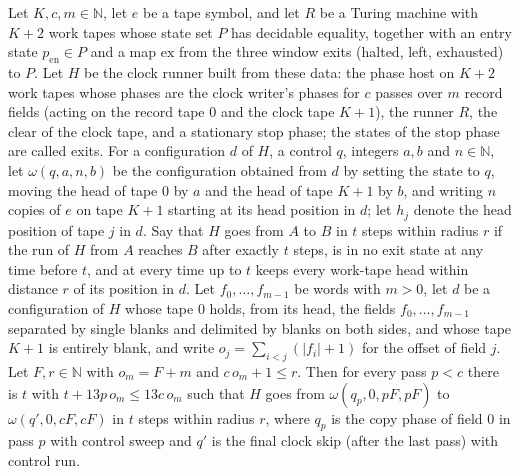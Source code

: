 \begin{lemma}
\label{Turing.cw_passes}
\leanok
{}
Let $K,c,m\in\mathbb{N}$, let $e$ be a tape symbol, and let $R$ be a Turing machine with $K+2$
work tapes whose state set $P$ has decidable equality, together with an entry state
$p_{\mathrm{en}}\in P$ and a map $\mathrm{ex}$ from the three window exits (halted, left,
exhausted) to $P$. Let $H$ be the clock runner built from these data: the phase host on $K+2$
work tapes whose phases are the clock writer's phases for $c$ passes over $m$ record fields
(acting on the record tape $0$ and the clock tape $K+1$), the runner $R$, the clear of the
clock tape, and a stationary stop phase; the states of the stop phase are called exits. For a
configuration $d$ of $H$, a control $q$, integers $a,b$ and $n\in\mathbb{N}$, let
$\omega(q,a,n,b)$ be the configuration obtained from $d$ by setting the state to $q$, moving
the head of tape $0$ by $a$ and the head of tape $K+1$ by $b$, and writing $n$ copies of $e$ on
tape $K+1$ starting at its head position in $d$; let $h_j$ denote the head position of tape $j$
in $d$. Say that $H$ goes from $A$ to $B$ in $t$ steps within radius $r$ if the run of $H$ from
$A$ reaches $B$ after exactly $t$ steps, is in no exit state at any time before $t$, and at
every time up to $t$ keeps every work-tape head within distance $r$ of its position in $d$. Let
$f_0,\dots,f_{m-1}$ be words with $m>0$, let $d$ be a configuration of $H$ whose tape $0$
holds, from its head, the fields $f_0,\dots,f_{m-1}$ separated by single blanks and delimited
by blanks on both sides, and whose tape $K+1$ is entirely blank, and write
$o_j=\sum_{i<j}(|f_i|+1)$ for the offset of field $j$. Let $F,r\in\mathbb{N}$ with $o_m=F+m$
and $c\,o_m+1\le r$. Then for every pass $p<c$ there is $t$ with $t+13p\,o_m\le 13c\,o_m$ such
that $H$ goes from $\omega(q_p,0,pF,pF)$ to $\omega(q',0,cF,cF)$ in $t$ steps within radius
$r$, where $q_p$ is the copy phase of field $0$ in pass $p$ with control sweep and $q'$ is the
final clock skip (after the last pass) with control run.
\end{lemma}


